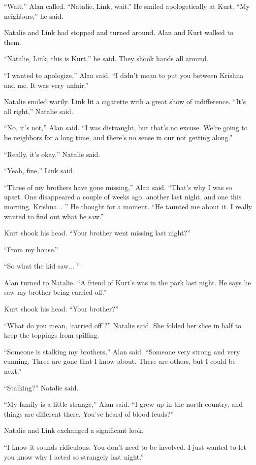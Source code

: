 \documentclass{article}
\begin{document}
``Wait,'' Alan called.  ``Natalie, Link, wait.'' He smiled
apologetically at Kurt.  ``My neighbors,'' he said.

Natalie and Link had stopped and turned around.  Alan and Kurt walked
to them.

``Natalie, Link, this is Kurt,'' he said.  They shook hands all
around.

``I wanted to apologize,'' Alan said.  ``I didn't mean to put you
between Krishna and me.  It was very unfair.''

Natalie smiled warily.  Link lit a cigarette with a great show of
indifference.  ``It's all right,'' Natalie said.

``No, it's not,'' Alan said.  ``I was distraught, but that's no
excuse.  We're going to be neighbors for a long time, and there's no
sense in our not getting along.''

``Really, it's okay,'' Natalie said.

``Yeah, fine,'' Link said.

``Three of my brothers have gone missing,'' Alan said.  ``That's why I
was so upset.  One disappeared a couple of weeks ago, another last
night, and one this morning.  Krishna...  '' He thought for a moment. 
``He taunted me about it.  I really wanted to find out what he saw.''

Kurt shook his head.  ``Your brother went missing last night?''

``From my house.''

``So what the kid saw...  ''

Alan turned to Natalie.  ``A friend of Kurt's was in the park last
night.  He says he saw my brother being carried off.''

Kurt shook his head.  ``Your brother?''

``What do you mean, `carried off'?'' Natalie said.  She folded her
slice in half to keep the toppings from spilling.

``Someone is stalking my brothers,'' Alan said.  ``Someone very strong
and very cunning.  Three are gone that I know about.  There are
others, but I could be next.''

``Stalking?'' Natalie said.

``My family is a little strange,'' Alan said.  ``I grew up in the
north country, and things are different there.  You've heard of blood
feuds?''

Natalie and Link exchanged a significant look.

``I know it sounds ridiculous.  You don't need to be involved.  I just
wanted to let you know why I acted so strangely last night.''
\end{document}
